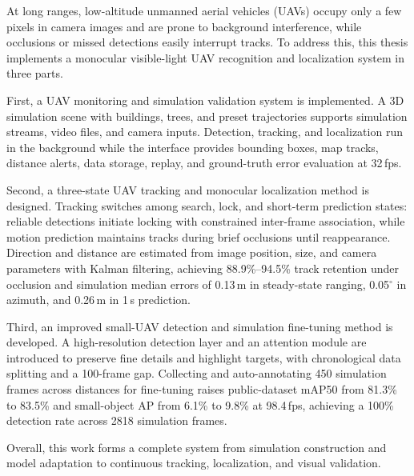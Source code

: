 \begin{EnglishAbstract}

At long ranges, low-altitude unmanned aerial vehicles (UAVs) occupy only a few pixels in camera images and are prone to background interference, while occlusions or missed detections easily interrupt tracks. To address this, this thesis implements a monocular visible-light UAV recognition and localization system in three parts.

First, a UAV monitoring and simulation validation system is implemented. A 3D simulation scene with buildings, trees, and preset trajectories supports simulation streams, video files, and camera inputs. Detection, tracking, and localization run in the background while the interface provides bounding boxes, map tracks, distance alerts, data storage, replay, and ground-truth error evaluation at 32\,fps.

Second, a three-state UAV tracking and monocular localization method is designed. Tracking switches among search, lock, and short-term prediction states: reliable detections initiate locking with constrained inter-frame association, while motion prediction maintains tracks during brief occlusions until reappearance. Direction and distance are estimated from image position, size, and camera parameters with Kalman filtering, achieving 88.9\%--94.5\% track retention under occlusion and simulation median errors of 0.13\,m in steady-state ranging, 0.05$^{\circ}$ in azimuth, and 0.26\,m in 1\,s prediction.

Third, an improved small-UAV detection and simulation fine-tuning method is developed. A high-resolution detection layer and an attention module are introduced to preserve fine details and highlight targets, with chronological data splitting and a 100-frame gap. Collecting and auto-annotating 450 simulation frames across distances for fine-tuning raises public-dataset mAP50 from 81.3\% to 83.5\% and small-object AP from 6.1\% to 9.8\% at 98.4\,fps, achieving a 100\% detection rate across 2818 simulation frames.

Overall, this work forms a complete system from simulation construction and model adaptation to continuous tracking, localization, and visual validation.


\end{EnglishAbstract}
